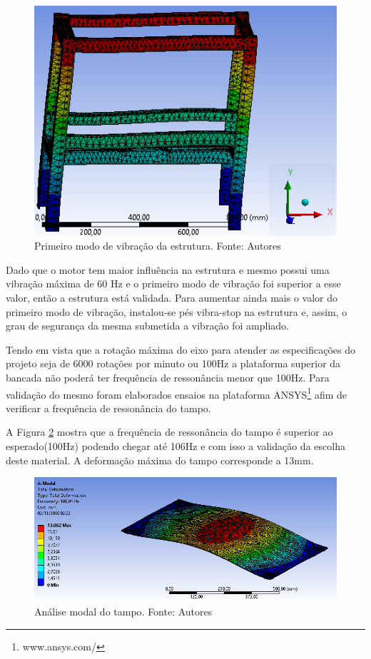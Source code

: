   \begin{figure}[H]
      \centering
      \includegraphics[scale=0.6]{figuras/vib_estrutura.png}
      \caption{Primeiro modo de vibração da estrutura. Fonte: Autores}
      \label{fig:vib_estrutura}
      \end{figure}

      Dado que o motor tem maior influência na estrutura e mesmo possui uma vibração máxima de 60 Hz e o primeiro modo de vibração foi superior 
      a esse valor, então a estrutura está validada. Para aumentar ainda mais o valor do primeiro modo de vibração, instalou-se pés vibra-stop na estrutura e, 
      assim, o grau de segurança da mesma submetida a vibração foi ampliado.


    Tendo em vista que a rotação máxima do eixo para atender as especificações do projeto seja de 6000 rotações por minuto ou 100Hz a 
    plataforma superior da bancada não poderá ter frequência de ressonância menor que 100Hz. Para validação do mesmo foram elaborados ensaios 
    na plataforma ANSYS\footnote{www.ansys.com/} afim de verificar a frequência de ressonância do tampo.

    A Figura \ref{fig:tampo} mostra que a frequência de ressonância do tampo é superior ao esperado(100Hz) podendo chegar até 106Hz e com isso a
    validação da escolha deste material. A deformação máxima do tampo corresponde a 13mm.

  \begin{figure}[H]
      \centering
      \includegraphics[scale=0.6]{figuras/tampo.png}
      \caption{Análise modal do tampo. Fonte: Autores}
      \label{fig:tampo}
      \end{figure}

